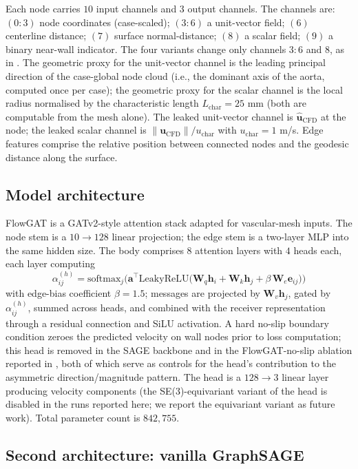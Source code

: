 \documentclass[10pt,a4paper]{article}
\newcommand{\unit}[1]{\hat{\mathbf{#1}}}
\begin{document}
Each node carries $10$ input channels and $3$ output channels. The
channels are: $(0{:}3)$ node coordinates (case-scaled); $(3{:}6)$ a
unit-vector field; $(6)$ centerline distance; $(7)$ surface
normal-distance; $(8)$ a scalar field; $(9)$ a binary near-wall
indicator. The four variants change only channels $3{:}6$ and $8$, as
in . The geometric proxy for the unit-vector
channel is the leading principal direction of the case-global node
cloud (i.e., the dominant axis of the aorta, computed once per case);
the geometric proxy for the scalar channel is the local radius
normalised by the characteristic length $L_{\text{char}}=25$ mm
(both are computable from the mesh alone). The leaked unit-vector
channel is $\unit{u}_{\text{CFD}}$ at the node; the leaked scalar
channel is $\|\mathbf{u}_{\text{CFD}}\|/u_{\text{char}}$ with
$u_{\text{char}}=1$ m/s. Edge features comprise the relative position
between connected nodes and the geodesic distance along the surface.

\subsection*{Model architecture}

FlowGAT is a GATv2-style attention stack adapted for
vascular-mesh inputs. The node stem is a $10 \!\to\! 128$ linear
projection; the edge stem is a two-layer MLP into the same hidden
size. The body comprises $8$ attention layers with $4$ heads each,
each layer computing
$$
\alpha_{ij}^{(h)} = \mathrm{softmax}_j\Big( \mathbf{a}^\top
\mathrm{LeakyReLU}\big(\mathbf{W}_q \mathbf{h}_i + \mathbf{W}_k
\mathbf{h}_j + \beta\,\mathbf{W}_e \mathbf{e}_{ij}\big) \Big)
$$
with edge-bias coefficient $\beta=1.5$; messages are projected by
$\mathbf{W}_v \mathbf{h}_j$, gated by $\alpha_{ij}^{(h)}$, summed
across heads, and combined with the receiver representation through a
residual connection and SiLU activation. A hard no-slip boundary
condition zeroes the predicted velocity on wall nodes prior to loss
computation; this head is removed in the SAGE backbone and in the
FlowGAT-no-slip ablation reported in , both
of which serve as controls for the head's contribution to the
asymmetric direction/magnitude pattern. The head is a $128 \!\to\! 3$ linear layer producing
velocity components (the SE(3)-equivariant variant of the head is
disabled in the runs reported here; we report the equivariant variant
as future work). Total parameter count is $842{,}755$.

\subsection*{Second architecture: vanilla GraphSAGE}
\end{document}
